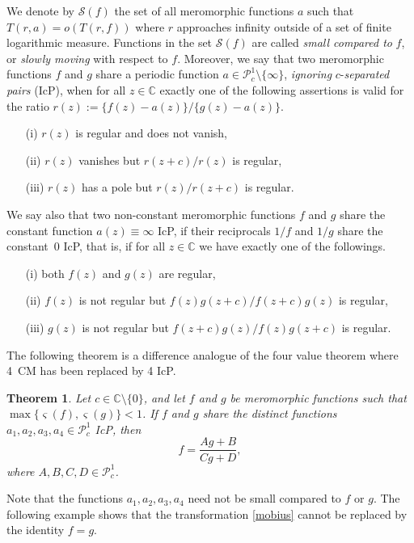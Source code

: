 \documentclass{amsart}
\newcommand{\C}{\mathbb{C}}
\newtheorem{theorem}{Theorem}%
\theoremstyle{definition}
\numberwithin{equation}{section}
\numberwithin{theorem}{section}
\begin{document}
We denote by $\mathcal{S}(f)$ the set of all  meromorphic
functions $a$ such that $T(r,a)=o(T(r,f))$ where $r$ approaches
infinity outside of a set of finite logarithmic measure. Functions
in the set $\mathcal{S}(f)$ are called \textit{small compared to}
$f$, or \textit{slowly moving} with respect to $f$. Moreover, we say that two meromorphic functions $f$ and $g$ share a periodic function $a\in\mathcal{P}^1_c\setminus\{\infty\}$,
\textit{ignoring} $c$-\textit{separated pairs} (IcP), when for all $z\in\C$ exactly one of the following
assertions is valid for the ratio $r(z):=\{f(z)-a(z)\}/\{g(z)-a(z)\}$.
    \begin{itemize}
    \item[(i)] $r(z)$ is regular and does not vanish,
    \item[(ii)] $r(z)$ vanishes but $r(z+c)/r(z)$ is regular,
    \item[(iii)] $r(z)$ has a pole but $r(z)/r(z+c)$ is regular.
    \end{itemize}
We say also that two non-constant meromorphic functions $f$ and $g$ share
the constant function $a(z)\equiv \infty$ IcP, if their reciprocals $1/f$ and $1/g$ share the constant~$0$ IcP,
that is, if for all $z\in\C$ we have exactly one of the followings.
    \begin{itemize}
    \item[(i)] both $f(z)$ and $g(z)$ are regular,
    \item[(ii)] $f(z)$ is not regular but $f(z)g(z+c)/f(z+c)g(z)$ is regular,
    \item[(iii)] $g(z)$ is not regular but $f(z+c)g(z)/f(z)g(z+c)$ is regular.
    \end{itemize}
The following theorem is a difference analogue of the four value
theorem where 4~CM has been replaced by 4 IcP.


\begin{theorem}\label{uniqueness}
Let $c\in\C\setminus\{0\}$, and let $f$ and $g$ be meromorphic functions such that $\max\{\varsigma(f),\varsigma(g)\}<1$. If $f$ and $g$ share the distinct functions $a_1,a_2,a_3,a_4\in \mathcal{P}^1_c$ IcP, then
    \begin{equation}\label{mobius}
    f=\frac{Ag+B}{Cg+D},
    \end{equation}
where $A,B,C,D\in\mathcal{P}_c^1$.
\end{theorem}

Note that the functions $a_1,a_2,a_3,a_4$ need not be small
compared to $f$ or $g$. The following example shows that the
transformation \eqref{mobius} cannot be replaced by the identity
$f=g$.
\end{document}
